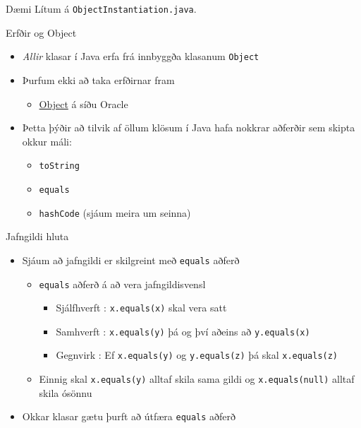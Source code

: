 \documentclass{beamer}
\begin{document}
\begin{frame}{Dæmi}
	Lítum á \texttt{ObjectInstantiation.java}.
\end{frame}

\begin{frame}{Erfðir og Object}
	\begin{itemize}
		\item \emph{Allir} klasar í Java erfa frá innbyggða klasanum \texttt{Object}
		\item Þurfum ekki að taka erfðirnar fram
		      \begin{itemize}
			      \item \href{https://docs.oracle.com/javase/8/docs/api/java/lang/Object.html}{Object} á síðu Oracle
		      \end{itemize}
		\item Þetta þýðir að tilvik af öllum klösum í Java hafa nokkrar aðferðir sem skipta okkur máli:
		      \begin{itemize}
			      \item \texttt{toString}
			      \item \texttt{equals}
			      \item \texttt{hashCode} (sjáum meira um seinna)
		      \end{itemize}
	\end{itemize}
\end{frame}

\begin{frame}{Jafngildi hluta}
	\begin{itemize}
		\item Sjáum að jafngildi er skilgreint með \texttt{equals} aðferð
		      \begin{itemize}
			      \item \texttt{equals} aðferð á að vera jafngildisvensl 
			            \begin{itemize}
				            \item Sjálfhverft : \texttt{x.equals(x)} skal vera satt
				            \item Samhverft : \texttt{x.equals(y)} þá og því aðeins að \texttt{y.equals(x)}
				            \item Gegnvirk : Ef \texttt{x.equals(y)} og \texttt{y.equals(z)} þá skal \texttt{x.equals(z)}
			            \end{itemize}
			      \item Einnig skal \texttt{x.equals(y)} alltaf skila sama gildi og \texttt{x.equals(null)} alltaf skila ósönnu
		      \end{itemize}
		\item Okkar klasar gætu þurft að útfæra \texttt{equals} aðferð
	\end{itemize}
\end{frame}
\end{document}
